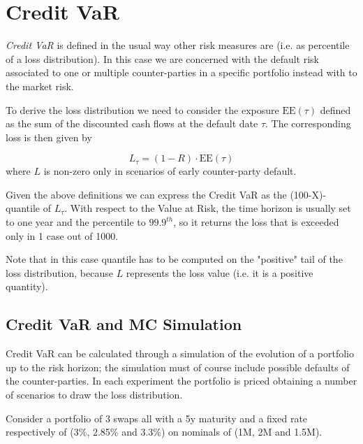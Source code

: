 \section{Credit VaR}
\label{credit-var-cr-var}

\emph{Credit VaR} is defined in the usual way other risk measures are (i.e. as percentile of a loss distribution). In this case we are concerned with the default risk associated to one or multiple counter-parties in a specific portfolio instead with to the market risk.

To derive the loss distribution we need to consider the exposure $\text{EE}(\tau)$ defined as the sum of the discounted cash flows at the default date $\tau$. The corresponding loss is then given by

\begin{equation}
L_{\tau} = (1 - R) \cdot \textrm{EE}(\tau)
\end{equation}
where $L$ is non-zero only in scenarios of early counter-party default. 

Given the above definitions we can express the Credit VaR as the (100-X)-quantile of $L_{\tau}$. With respect to the Value at Risk, the time horizon is usually set to one year and the percentile to $99.9^{th}$, so it returns the loss that is exceeded only in 1 case out of 1000. 

Note that in this case quantile has to be computed on the "positive" tail of the loss distribution, because $L$ represents the loss value (i.e. it is a positive quantity).


\subsection{Credit VaR and MC Simulation}
\label{sec:credit-var-sim}

Credit VaR can be calculated through a simulation of the evolution of a portfolio up to the risk horizon; the simulation must of course include possible defaults of the counter-parties. In each experiment the portfolio is priced obtaining a number of scenarios to draw the loss distribution.

Consider a portfolio of 3 swaps all with a 5y maturity and a fixed rate respectively of (3\%, 2.85\% and 3.3\%) on nominals of (1M, 2M and 1.5M).

